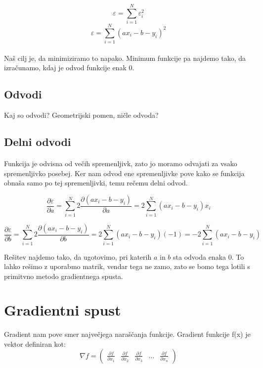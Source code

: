 \documentclass[a4paper, 12pt]{article}
\begin{document}
	$$\varepsilon = \sum_{i=1}^{N} \varepsilon_i^2$$
	$$\varepsilon = \sum_{i=1}^{N} (a x_i - b - y_i)^2$$

	\paragraph{}
	Naš cilj je, da minimiziramo to napako. Minimum funkcije pa najdemo tako, da izračunamo, kdaj je odvod funkcije enak 0.

	\subsection*{Odvodi}
	Kaj so odvodi? Geometrijski pomen, ničle odvoda?

	\subsection*{Delni odvodi}
	\paragraph{}
	Funkcija je odvisna od večih spremenljivk, zato jo moramo odvajati za vsako spremenljivko posebej. Ker nam odvod ene spremenljivke pove kako se funkcija obnaša samo po tej spremenljivki, temu rečemu delni odvod.
	

	$$\frac{\partial \varepsilon}{\partial a} =
		\sum_{i=1}^{N} 2 \frac{\partial (a x_i - b - y_i)}{\partial a} =
		2 \sum_{i=1}^{N} (a x_i - b - y_i)x_i$$

	$$\frac{\partial \varepsilon}{\partial b} =
		\sum_{i=1}^{N} 2 \frac{\partial (a x_i - b - y_i)}{\partial b} =
		2 \sum_{i=1}^{N} (a x_i - b - y_i)(-1) = -2 \sum_{i=1}^{N} (a x_i - b - y_i)$$

	Rešitev najdemo tako, da ugotovimo, pri katerih $a$ in $b$ sta odvoda enaka 0. To lahko rešimo z uporabmo matrik, vendar tega ne zamo, zato se bomo tega lotili s primitvno metodo gradientnega spusta.
	
	\section*{Gradientni spust}
	\paragraph{}
	Gradient nam pove smer največjega naraščanja funkcije. Gradient funkcije f(x) je vektor definiran kot:
	$$\nabla f = \begin{pmatrix}\frac{\partial f}{\partial x_{1}} & \frac{\partial f}{\partial x_{2}} & \frac{\partial f}{\partial x_{3}} & ... & \frac{\partial f}{\partial x_{n}}\end{pmatrix}$$
	
\end{document}

